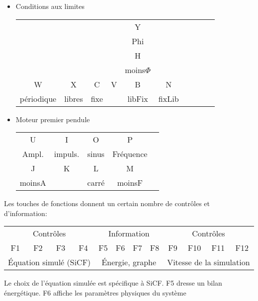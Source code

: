 \begin{itemize}[leftmargin=2cm, label=, itemsep=0pt]%
\item Conditions aux limites

\hspace{3cm}
\begin{tabular}{cccccccccc}
 & & & &\sf Y \\
 & & & & Phi \\
 & & & &\sf H \\
 & & & & moins$\Phi$  & & &  & \\
\sf W &\sf X &\sf C &\sf V &\sf B &\sf N  \\
périodique & libres & fixe &  & libFix & fixLib  \\
\end{tabular}
%
\end{itemize}
\begin{itemize}[leftmargin=2cm, label=, itemsep=0pt]%
\item Moteur premier pendule

\hspace{9cm}
\begin{tabular}{ccccc}
\sf U &\sf I &\sf O &\sf P \\
 Ampl. & impuls. & sinus & Fréquence \\
\sf J &\sf K &\sf L &\sf M \\
 moinsA &  & carré & moinsF \\
\end{tabular}
%
\end{itemize}
Les touches de fonctions donnent un certain nombre de contrôles et d'information:
%
\begin{center}
\begin{tabular}{ccccc ccccc cc}
\multicolumn{4}{|c|}{Contrôles} & \multicolumn{4}{c}{Information} & \multicolumn{4}{|c|}{Contrôles}\\
\sf F1 &\sf F2 &\sf F3 &\sf F4 &\sf F5 &\sf F6 &\sf F7 &\sf F8 &\sf F9 &\sf F10 &\sf F11 &\sf F12 \\
\multicolumn{4}{|c|}{Équation simulé (SiCF)} & \multicolumn{4}{c}{Énergie, graphe} & \multicolumn{4}{|c|}{Vitesse de la simulation}\\
\end{tabular}
\end{center}
%
Le choix de l'équation simulée est spécifique à SiCF. {\sf F5} dresse un bilan énergétique. {\sf F6} affiche les paramètres physiques du système

